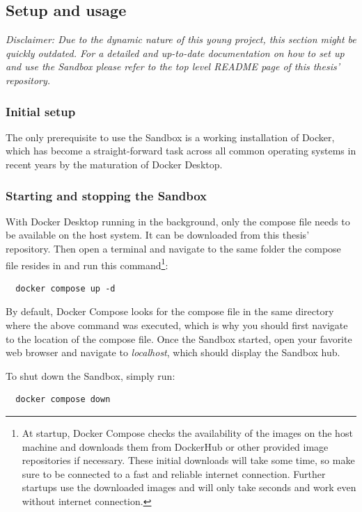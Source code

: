 \documentclass[11pt, a4paper, oneside, parskip=full-]{scrartcl}
\begin{document}
\subsection{Setup and usage}
\emph{Disclaimer: Due to the dynamic nature of this young project, this section
might be quickly outdated. For a detailed and up-to-date documentation on how to
set up and use the Sandbox please refer to the top level README page of this
thesis' repository\cite{osgeostacksandbox}.}

\subsubsection*{Initial setup}
The only prerequisite to use the Sandbox is a working installation of Docker,
which has become a straight-forward task across all common operating systems in
recent years by the maturation of Docker Desktop\cite{dockerdesktop}.

\subsubsection*{Starting and stopping the Sandbox}
With Docker Desktop running in the background, only the compose file needs to be
available on the host system. It can be downloaded from this thesis'
repository\cite{sandboxcomposefile}. Then open a terminal and navigate to the
same folder the compose file resides in and run this command\footnote{At
startup, Docker Compose checks the availability of the images on the host
machine and downloads them from DockerHub or other provided image repositories
if necessary. These initial downloads will take some time, so make sure to be
connected to a fast and reliable internet connection. Further startups use the
downloaded images and will only take seconds and work even without internet
connection.}:
\begin{lstlisting}
  docker compose up -d
\end{lstlisting}

By default, Docker Compose looks for the compose file in the same directory
where the above command was executed, which is why you should first navigate to
the location of the compose file. Once the Sandbox started, open your favorite
web browser and navigate to \emph{localhost}, which should display the Sandbox
hub.

To shut down the Sandbox, simply run:
\begin{lstlisting}
  docker compose down
\end{lstlisting}
\end{document}
